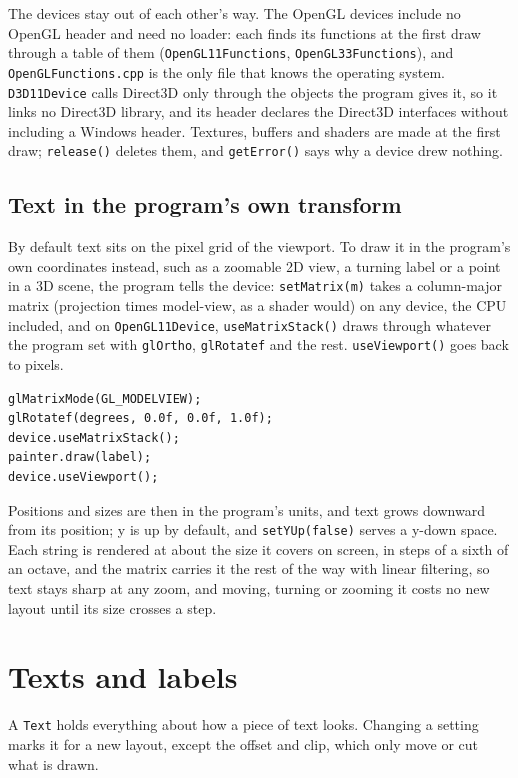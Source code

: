 \documentclass[11pt]{article}
\begin{document}
The devices stay out of each other's way. The OpenGL devices include no OpenGL header and need no loader: each finds its functions at the first draw through a table of them (\texttt{OpenGL11Functions}, \texttt{OpenGL33Functions}), and \texttt{OpenGLFunctions.cpp} is the only file that knows the operating system. \texttt{D3D11Device} calls Direct3D only through the objects the program gives it, so it links no Direct3D library, and its header declares the Direct3D interfaces without including a Windows header. Textures, buffers and shaders are made at the first draw; \texttt{release()} deletes them, and \texttt{getError()} says why a device drew nothing.

\subsection*{Text in the program's own transform}

By default text sits on the pixel grid of the viewport. To draw it in the program's own coordinates instead, such as a zoomable 2D view, a turning label or a point in a 3D scene, the program tells the device: \texttt{setMatrix(m)} takes a column-major matrix (projection times model-view, as a shader would) on any device, the CPU included, and on \texttt{OpenGL11Device}, \texttt{useMatrixStack()} draws through whatever the program set with \texttt{glOrtho}, \texttt{glRotatef} and the rest. \texttt{useViewport()} goes back to pixels.

\begin{lstlisting}
glMatrixMode(GL_MODELVIEW);
glRotatef(degrees, 0.0f, 0.0f, 1.0f);
device.useMatrixStack();
painter.draw(label);
device.useViewport();
\end{lstlisting}

Positions and sizes are then in the program's units, and text grows downward from its position; y is up by default, and \texttt{setYUp(false)} serves a y-down space. Each string is rendered at about the size it covers on screen, in steps of a sixth of an octave, and the matrix carries it the rest of the way with linear filtering, so text stays sharp at any zoom, and moving, turning or zooming it costs no new layout until its size crosses a step.

\section{Texts and labels}

A \texttt{Text} holds everything about how a piece of text looks. Changing a setting marks it for a new layout, except the offset and clip, which only move or cut what is drawn.
\end{document}
